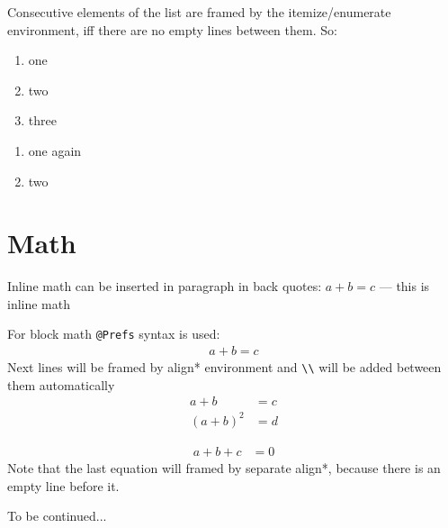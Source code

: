 \documentclass[12pt,a4paper,oneside]{article}
\begin{document}
Consecutive elements of the list are framed by the itemize/enumerate environment,
iff there are no empty lines between them. So:
\begin{enumerate}
\item one
\item two
\item three
\end{enumerate}

\begin{enumerate}
\item one again
\item two
\end{enumerate}

\section{Math}
Inline math can be inserted in paragraph in back quotes: $a + b = c$ 
--- this is inline math

For block math \texttt{@Prefs} syntax is used: 
\begin{align*}
a + b = c 
\end{align*}
Next lines will be framed by align* environment and \verb.\\. 
will be added between them automatically
\begin{align*}
a + b     &= c
\\(a + b)^2 &= d
\end{align*}

\begin{align*}
a + b + c &= 0
\end{align*}
Note that the last equation will framed by separate align*, because
there is an empty line before it. 

To be continued... 
\end{document}

